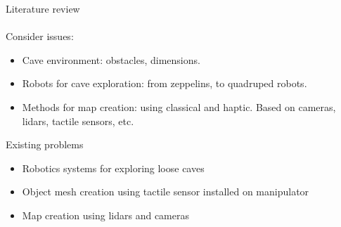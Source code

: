 \documentclass[aspectratio=169,xcolor=table]{beamer}
\begin{document}



\begin{frame}[t]{Literature review}
    \framesubtitle{}
    \vspace{-0.3cm}
    \large
    Consider issues:
    \vspace{-0.1cm}
    \begin{itemize}
        \item Cave environment: obstacles, dimensions.
        \item Robots for cave exploration: from zeppelins, to quadruped robots.
        \item Methods for map creation: using classical and haptic. Based on cameras, lidars, tactile sensors, etc.
    \end{itemize}
    \vspace{-0.2cm}

    \begin{block}{Existing problems}
        \begin{itemize}
            \item Robotics systems for exploring loose caves
            \item Object mesh creation using tactile sensor installed on manipulator
            \item Map creation using lidars and cameras
        \end{itemize}
    \end{block}
    \vspace{-0.2cm}

\end{frame}
\end{document}
